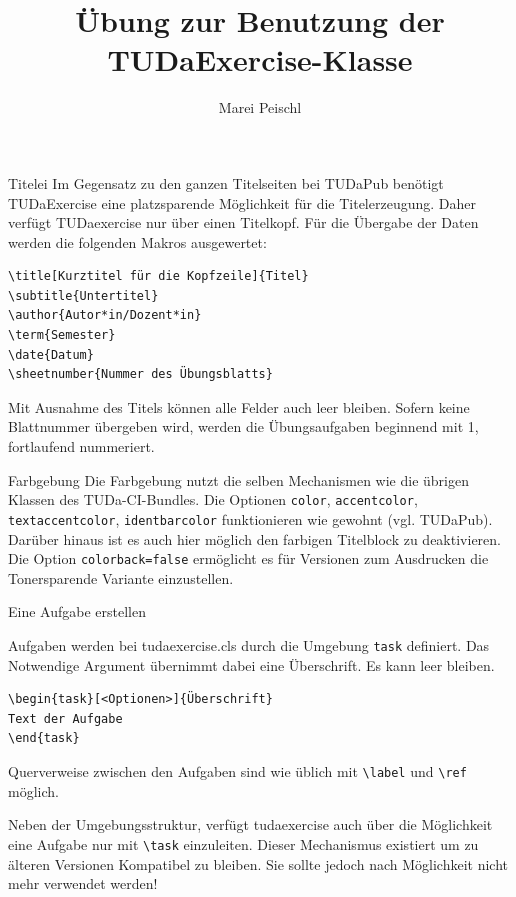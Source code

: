 \documentclass[
	ngerman,%
	accentcolor=9c,%
	points=true, für die Aktivierung der Punktereferenzen
]{tudaexercise}
\title[Übung TUDaExercise]{Übung zur Benutzung der TUDaExercise-Klasse}
\author{Marei Peischl}
\newcommand*{\code}[1]{\texttt{#1}}
\newcommand*{\cls}[1]{\textsf{#1}}
\let\tbs\textbackslash
\begin{document}
\maketitle

\begin{task}{Titelei}
	Im Gegensatz zu den ganzen Titelseiten bei TUDaPub benötigt TUDaExercise eine platzsparende Möglichkeit für die Titelerzeugung.
	Daher verfügt TUDaexercise nur über einen Titelkopf.
	Für die Übergabe der Daten werden die folgenden Makros ausgewertet:

\begin{verbatim}
\title[Kurztitel für die Kopfzeile]{Titel}
\subtitle{Untertitel}
\author{Autor*in/Dozent*in}
\term{Semester}
\date{Datum}
\sheetnumber{Nummer des Übungsblatts}
\end{verbatim}

	Mit Ausnahme des Titels können alle Felder auch leer bleiben.
	Sofern keine Blattnummer übergeben wird, werden die Übungsaufgaben beginnend mit 1, fortlaufend nummeriert.
\end{task}

\begin{task}{Farbgebung}
	Die Farbgebung nutzt die selben Mechanismen wie die übrigen Klassen des TUDa-CI-Bundles. Die Optionen \code{color}, \code{accentcolor}, \code{textaccentcolor}, \code{identbarcolor} funktionieren wie gewohnt (vgl. TUDaPub). Darüber hinaus ist es auch hier möglich den farbigen Titelblock zu deaktivieren. Die Option \code{colorback=false} ermöglicht es für Versionen zum Ausdrucken die Tonersparende Variante einzustellen.
\end{task}

\begin{task}{Eine Aufgabe erstellen}

	Aufgaben werden bei \cls{tudaexercise.cls} durch die Umgebung \code{task} definiert. Das Notwendige Argument übernimmt dabei eine Überschrift. Es kann leer bleiben.

\begin{verbatim}
\begin{task}[<Optionen>]{Überschrift}
Text der Aufgabe
\end{task}
\end{verbatim}

	Querverweise zwischen den Aufgaben sind wie üblich mit \code{\tbs{}label} und \code{\tbs{}ref} möglich.

	\minisec{Die Verwendung des Makros \code{\tbs{}task}}
	Neben der Umgebungsstruktur, verfügt \cls{tudaexercise} auch über die Möglichkeit eine Aufgabe nur mit \code{\tbs{}task} einzuleiten. Dieser Mechanismus existiert um zu älteren Versionen Kompatibel zu bleiben. Sie sollte jedoch nach Möglichkeit nicht mehr verwendet werden!

\end{task}
\end{document}
